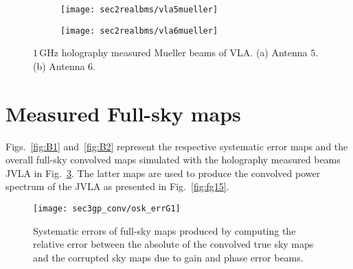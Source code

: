 \begin{appendices}
\begin{figure}
  \centering
  \begin{minipage}[H]{\linewidth}
     \begin{subfigure}[b]{0.8\textwidth}
                \texttt{[image: sec2realbms/vla5mueller]}
                \caption{}
                \label{fig:A2a}
        \end{subfigure}
        \begin{subfigure}[b]{0.8\textwidth}
                \texttt{[image: sec2realbms/vla6mueller]}
                \caption{}
               \label{fig:A2b}
        \end{subfigure}
         \end{minipage}
        \caption{$1\, \mathrm{GHz}$ holography measured Mueller beams of VLA. (a) Antenna $5$.
      (b) Antenna 6.} \label{fig:A2}
  \end{figure}
  \FloatBarrier


\section{Measured Full-sky maps} \label{sec:B}


Figs.~\ref{fig:B1} and~\ref{fig:B2} represent the respective systematic error maps and the overall full-sky convolved maps simulated with the holography measured beams 
JVLA in Fig.~\ref{fig:A2}. The latter maps are used to produce the convolved power spectrum of the JVLA as presented in Fig.~\ref{fig:fg15}. 
 \begin{figure}
\begin{minipage}[H]{\linewidth}
      \centering
      \texttt{[image: sec3gp\_conv/osk\_errG1]}
      \end{minipage}
 \caption{Systematic errors of full-sky maps produced by computing the relative error between the absolute of the convolved true sky maps and the corrupted sky maps due to gain and phase error beams.}\label{fig:fgerr}
\end{figure}
\FloatBarrier


\end{appendices}
